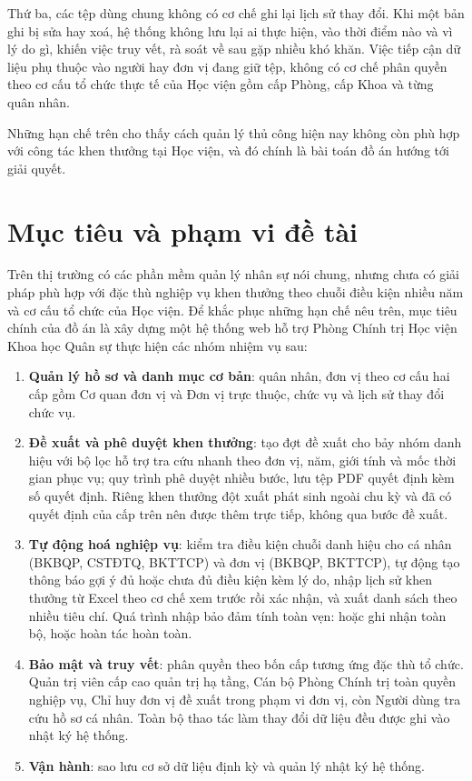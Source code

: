 \documentclass[../DoAn.tex]{subfiles}
\begin{document}
Thứ ba, các tệp dùng chung không có cơ chế ghi lại lịch sử thay đổi.
Khi một bản ghi bị sửa hay xoá, hệ thống không lưu lại ai thực hiện, vào thời điểm nào và vì lý do gì, khiến việc truy vết, rà soát về sau gặp nhiều khó khăn.
Việc tiếp cận dữ liệu phụ thuộc vào người hay đơn vị đang giữ tệp, không có cơ chế phân quyền theo cơ cấu tổ chức thực tế của Học viện gồm cấp Phòng, cấp Khoa và từng quân nhân.

Những hạn chế trên cho thấy cách quản lý thủ công hiện nay không còn phù hợp với công tác khen thưởng tại Học viện, và đó chính là bài toán đồ án hướng tới giải quyết.

\section{Mục tiêu và phạm vi đề tài}
\label{section:1.2}

Trên thị trường có các phần mềm quản lý nhân sự nói chung, nhưng chưa có giải pháp phù hợp với đặc thù nghiệp vụ khen thưởng theo chuỗi điều kiện nhiều năm và cơ cấu tổ chức của Học viện.
Để khắc phục những hạn chế nêu trên, mục tiêu chính của đồ án là xây dựng một hệ thống web hỗ trợ Phòng Chính trị Học viện Khoa học Quân sự thực hiện các nhóm nhiệm vụ sau:

\begin{enumerate}
    \item \textbf{Quản lý hồ sơ và danh mục cơ bản}: quân nhân, đơn vị theo cơ cấu hai cấp gồm Cơ quan đơn vị và Đơn vị trực thuộc, chức vụ và lịch sử thay đổi chức vụ.
    \item \textbf{Đề xuất và phê duyệt khen thưởng}: tạo đợt đề xuất cho bảy nhóm danh hiệu với bộ lọc hỗ trợ tra cứu nhanh theo đơn vị, năm, giới tính và mốc thời gian phục vụ; quy trình phê duyệt nhiều bước, lưu tệp PDF quyết định kèm số quyết định. Riêng khen thưởng đột xuất phát sinh ngoài chu kỳ và đã có quyết định của cấp trên nên được thêm trực tiếp, không qua bước đề xuất.
    \item \textbf{Tự động hoá nghiệp vụ}: kiểm tra điều kiện chuỗi danh hiệu cho cá nhân (BKBQP, CSTĐTQ, BKTTCP) và đơn vị (BKBQP, BKTTCP), tự động tạo thông báo gợi ý đủ hoặc chưa đủ điều kiện kèm lý do, nhập lịch sử khen thưởng từ Excel theo cơ chế xem trước rồi xác nhận, và xuất danh sách theo nhiều tiêu chí. Quá trình nhập bảo đảm tính toàn vẹn: hoặc ghi nhận toàn bộ, hoặc hoàn tác hoàn toàn.
    \item \textbf{Bảo mật và truy vết}: phân quyền theo bốn cấp tương ứng đặc thù tổ chức. Quản trị viên cấp cao quản trị hạ tầng, Cán bộ Phòng Chính trị toàn quyền nghiệp vụ, Chỉ huy đơn vị đề xuất trong phạm vi đơn vị, còn Người dùng tra cứu hồ sơ cá nhân. Toàn bộ thao tác làm thay đổi dữ liệu đều được ghi vào nhật ký hệ thống.
    \item \textbf{Vận hành}: sao lưu cơ sở dữ liệu định kỳ và quản lý nhật ký hệ thống.
\end{enumerate}
\end{document}
